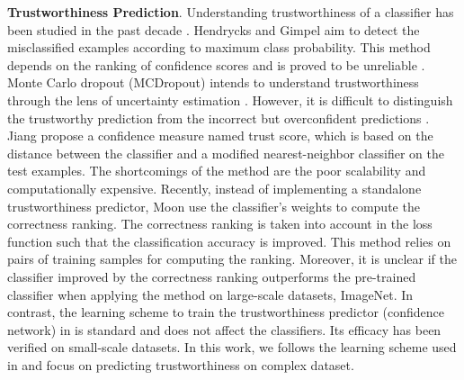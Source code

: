 \noindent\textbf{Trustworthiness Prediction}.
Understanding trustworthiness of a classifier has been studied in the past decade \cite{Jiang_NIPS_2018,Corbiere_NIPS_2019,Hendrycks_ICLR_2017,Gal_ICML_2016,Moon_ICML_2020}.
Hendrycks and Gimpel \cite{Hendrycks_ICLR_2017} aim to detect the misclassified examples according to maximum class probability. 
This method depends on the ranking of confidence scores and is proved to be unreliable \cite{Jiang_NIPS_2018}.
Monte Carlo dropout (MCDropout) intends to understand trustworthiness through the lens of uncertainty estimation \cite{Gal_ICML_2016}.
However, it is difficult to distinguish the trustworthy prediction from the incorrect but overconfident predictions \cite{Corbiere_NIPS_2019}.
Jiang \etal \cite{Jiang_NIPS_2018} propose a confidence measure named trust score, which is based on the distance between the classifier and a modified nearest-neighbor classifier on the test examples. The shortcomings of the method are the poor scalability and computationally expensive.
Recently, instead of implementing a standalone trustworthiness predictor, Moon \etal \cite{Moon_ICML_2020} use the classifier's weights to compute the correctness ranking. The correctness ranking is taken into account in the loss function such that the classification accuracy is improved.
This method relies on pairs of training samples for computing the ranking. Moreover, it is unclear if the classifier improved by the correctness ranking outperforms the pre-trained classifier when applying the method on large-scale datasets, \eg ImageNet.
In contrast, the learning scheme to train the trustworthiness predictor (\ie confidence network) in \cite{Corbiere_NIPS_2019} is standard and does not affect the classifiers. Its efficacy has been verified on small-scale datasets.
In this work, we follows the learning scheme used in \cite{Corbiere_NIPS_2019} and focus on predicting trustworthiness on complex dataset.



